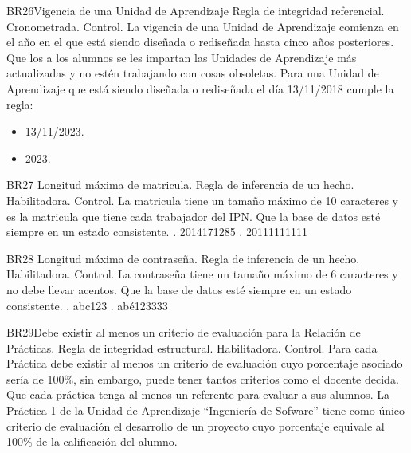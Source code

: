\begin{BussinesRule}{BR26}{Vigencia de una Unidad de Aprendizaje}
    \BRitem[Tipo:] Regla de integridad referencial.
    \BRitem[Clase:] Cronometrada.
    \BRitem[Nivel:] Control.
    \BRitem[Descripción:] La vigencia de una Unidad de Aprendizaje comienza en el año en el que está siendo diseñada o rediseñada hasta cinco años posteriores.
    \BRitem[Motivación:] Que los a los alumnos se les impartan las Unidades de Aprendizaje más actualizadas y no estén trabajando con cosas obsoletas.
     Para una Unidad de Aprendizaje que está siendo diseñada o rediseñada el día 13/11/2018 cumple la regla:
        \begin{itemize}
            \item 13/11/2023.
            \item 2023.
        \end{itemize}
\end{BussinesRule}

\begin{BussinesRule}{BR27}{ Longitud máxima de matricula.}
    \BRitem[Tipo: ]Regla de inferencia de un hecho.
    \BRitem[Clase: ]Habilitadora.
    \BRitem[Nivel: ]Control.
    \BRitem[Descripción: ]La matricula tiene un tamaño máximo de 10 caracteres y es la matricula que tiene cada trabajador del IPN.
    \BRitem[Sentencia:]
    \BRitem[Motivación: ]Que la base de datos esté siempre en un estado consistente.
     . 2014171285
    . 20111111111
\end{BussinesRule}

\begin{BussinesRule}{BR28}{ Longitud máxima de contraseña.}
    \BRitem[Tipo: ]Regla de inferencia de un hecho.
    \BRitem[Clase: ]Habilitadora.
    \BRitem[Nivel: ]Control.
    \BRitem[Descripción: ]La contraseña tiene un tamaño máximo de 6 caracteres y no debe llevar acentos.
    \BRitem[Sentencia:]
    \BRitem[Motivación: ]Que la base de datos esté siempre en un estado consistente.
     . abc123
    . abé123333
\end{BussinesRule}


\begin{BussinesRule}{BR29}{Debe existir al menos un criterio de evaluación para la Relación de Prácticas.}
    \BRitem[Tipo:] Regla de integridad estructural.
    \BRitem[Clase:] Habilitadora.
    \BRitem[Nivel:] Control.
    \BRitem[Descripción:] Para cada Práctica debe existir al menos un criterio de evaluación cuyo porcentaje asociado sería de 100\%, sin embargo, puede tener tantos criterios como el docente decida.
    \BRitem[Motivación:] Que cada práctica tenga al menos un referente para evaluar a sus alumnos.
     La Práctica 1 de la Unidad de Aprendizaje ``Ingeniería de Sofware'' tiene como único criterio de evaluación el desarrollo de un proyecto cuyo porcentaje equivale al 100\% de la calificación del alumno.
\end{BussinesRule}

